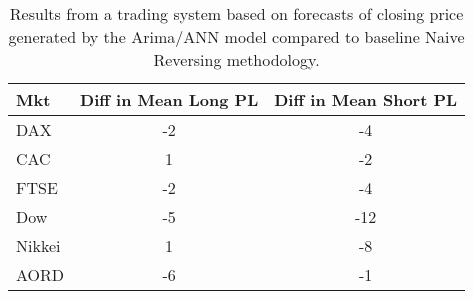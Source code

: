 \begin{table}[ht]
\centering
\caption[Arima/ANN predictions passed to System 1 compared to Naive Reversing methodology]{Results from a trading system based on forecasts of closing price generated by the Arima/ANN model compared to baseline Naive Reversing methodology.} 
\label{tab:chp_ts:arima_ann_sys1_diff}
\begin{tabular}{lcc}
  \toprule Mkt & Diff in Mean Long PL & Diff in Mean Short PL \\ 
  \midrule DAX & -2 & -4 \\ 
  CAC & 1 & -2 \\ 
  FTSE & -2 & -4 \\ 
  Dow & -5 & -12 \\ 
  Nikkei & 1 & -8 \\ 
  AORD & -6 & -1 \\ 
   \bottomrule \end{tabular}
\end{table}
